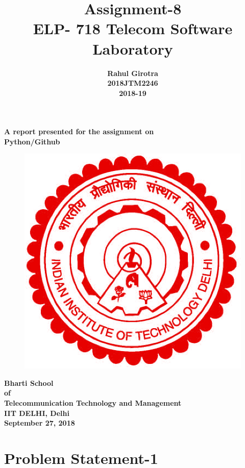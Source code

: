 \documentclass[12pt]{article}
\author{\textbf{Rahul Girotra} \\ \textbf{2018JTM2246}\\ \textbf{2018-19}}
\date{}
\title{\textbf{Assignment-8\\ELP- 718 Telecom Software Laboratory}}
\begin{document}
 
	\maketitle
	
	\begin{center}
	\noindent \textbf{A report presented for the assignment on\\ Python/Github}
	\vspace{1cm}
	
	\begin{figure}[h]
	\centering
	\includegraphics[scale=.2]{iitd.jpg}
	
	
	\end{figure}
	\vspace{1.5cm}
	
	\textbf{Bharti School\\of\\Telecommunication Technology and Management\\IIT DELHI, Delhi\\September 27, 2018}
	
	\end{center}
	
	\newpage
	\tableofcontents
	\listoffigures
	\newpage
	
	\section{Problem Statement-1}
	
\end{document}
